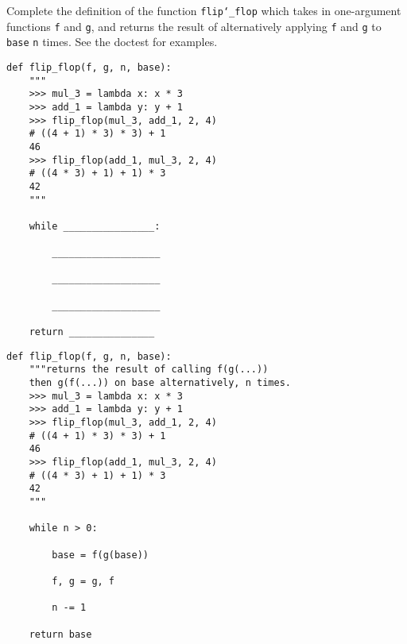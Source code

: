 \begin{blocksection}
\question Complete the definition of the function \texttt{flip\char`_flop} which takes in one-argument functions \texttt{f} and \texttt{g}, and returns the result of alternatively applying \texttt{f} and \texttt{g} to \texttt{base} \texttt{n} times. See the doctest for examples.
\begin{lstlisting}
def flip_flop(f, g, n, base):
	"""
	>>> mul_3 = lambda x: x * 3
	>>> add_1 = lambda y: y + 1
	>>> flip_flop(mul_3, add_1, 2, 4)
	# ((4 + 1) * 3) * 3) + 1
	46
	>>> flip_flop(add_1, mul_3, 2, 4)
	# ((4 * 3) + 1) + 1) * 3
	42
	"""

	while ________________:
	
		___________________
		
		___________________
		
		___________________
		
	return _______________

\end{lstlisting}

\begin{solution}
\begin{lstlisting}
def flip_flop(f, g, n, base):
	"""returns the result of calling f(g(...)) 
	then g(f(...)) on base alternatively, n times.
	>>> mul_3 = lambda x: x * 3
	>>> add_1 = lambda y: y + 1
	>>> flip_flop(mul_3, add_1, 2, 4)
	# ((4 + 1) * 3) * 3) + 1
	46
	>>> flip_flop(add_1, mul_3, 2, 4)
	# ((4 * 3) + 1) + 1) * 3
	42
	"""

	while n > 0:
	
		base = f(g(base))
		
		f, g = g, f
		
		n -= 1
		
	return base

\end{lstlisting}
\end{solution}
\end{blocksection}